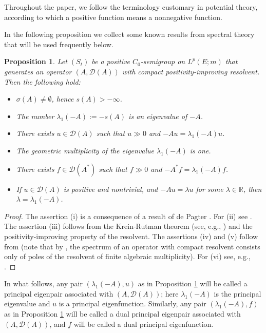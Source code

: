 \documentclass[11pt,a4paper,reqno]{amsart}
\newtheorem{proposition}[theorem]{\bf Proposition}
\theoremstyle{definition}
\numberwithin{equation}{section}
\begin{document}
Throughout the paper, we follow the terminology customary in potential theory, 
according to which a positive function means a nonnegative function.




In the following proposition we collect some  known results from  spectral theory that will be used frequently below.

\begin{proposition}
\label{prop.tool}
Let $(S_t)$ be a positive  $C_0$-semigroup on $L^p(E;m)$ that generates an operator $(A,\mathscr D(A))$
with compact  positivity-improving resolvent. 
Then  the following hold:
\begin{itemize}
\item[(i)] $\sigma(A) \neq \emptyset$, hence $s(A)>-\infty$.
\item[(ii)] The number $\lambda_1(-A):=-s(A)$ is an eigenvalue of $-A$.
\item[(iii)] There exists $u \in \mathscr D(A)$ such that $u\gg0$ and  $-A u=\lambda_1(-A) u$.
\item[(iv)] The geometric multiplicity of the eigenvalue $\lambda_1(-A)$ is one.
\item[(v)] There exists  $f\in \mathscr D(A^*)$ such that $f\gg0$ and $-A^*f=\lambda_1(-A) f$.
\item[(vi)] If $u\in \mathscr D(A)$ is positive and nontrivial, and $-Au=\lambda u$ for some $\lambda\in\mathbb R$,
then $\lambda=\lambda_1(-A)$. 
\end{itemize}
\end{proposition}
\begin{proof}
The assertion (i) is a consequence of  a result of de Pagter \cite[Theorem 3]{dePagter1986}.
For (ii) see \cite[Corollary 12.9]{BatkaiKramarFijavzRhandi2017}.
The assertion (iii) follows from the Krein-Rutman theorem (see, e.g., \cite[Theorem 12.15]{BatkaiKramarFijavzRhandi2017})
and the positivity-improving property of the resolvent.  The assertions (iv) and (v) follow from 
 \cite[Proposition 14.12(d)]{BatkaiKramarFijavzRhandi2017} (note that by \cite[Chapter~IV, Corollary~1.19]{EngelNagel2000}, 
 the spectrum of an operator with compact resolvent consists only of poles of the resolvent of finite algebraic multiplicity). 
 For (vi) see, e.g.,  \cite[Theorem V.5.2(iv)]{Schaefer1974}.
\end{proof}


In what follows, any pair  $(\lambda_1(-A),u)$ as in  Proposition 
\ref{prop.tool} will be  called a principal  eigenpair  associated with   $(A,\mathscr D(A))$; 
here $\lambda_1(-A)$ is  the principal eigenvalue and $u$ is a principal eigenfunction. Similarly, any  pair  
$(\lambda_1(-A),f)$ as in  Proposition \ref{prop.tool} will be called a dual 
principal eigenpair associated with   $(A,\mathscr D(A))$, and
 $f$ will be  called a dual  principal eigenfunction.
\end{document}
